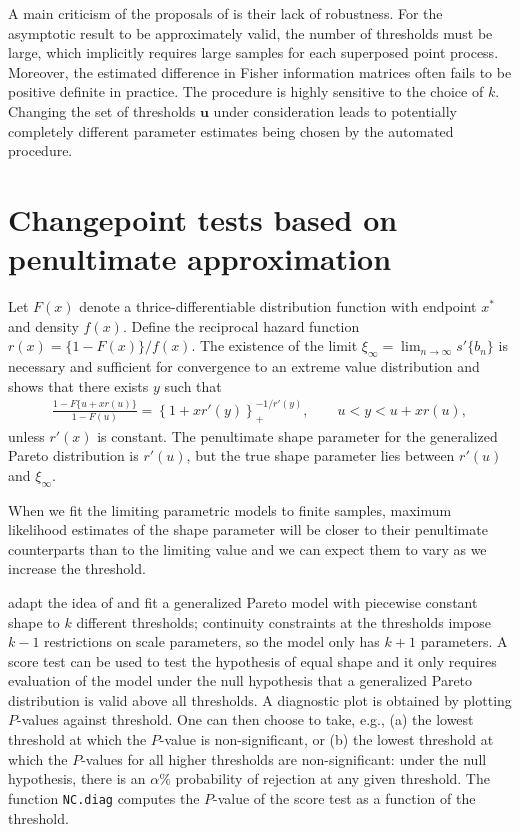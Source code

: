 \documentclass[]{book}
\begin{document}
A main criticism of the proposals of \citet{Wadsworth:2016} is their lack of robustness. For the asymptotic result to be approximately valid, the number of thresholds must be large, which implicitly requires large samples for each superposed point process. Moreover, the estimated difference in Fisher information matrices often fails to be positive definite in practice. The procedure is highly sensitive to the choice of \(k\). Changing the set of thresholds \(\boldsymbol{u}\) under consideration leads to potentially completely different parameter estimates being chosen by the automated procedure.

\hypertarget{changepoint-tests-based-on-penultimate-approximation}{%
\section{Changepoint tests based on penultimate approximation}\label{changepoint-tests-based-on-penultimate-approximation}}

Let \(F(x)\) denote a thrice-differentiable distribution function with endpoint \(x^*\) and density \(f(x)\). Define the reciprocal hazard function \(r(x) = \{1-F(x)\}/f(x)\).
The existence of the limit \(\xi_{\infty} = \lim_{n \to \infty} s'\{b_n\}\) is necessary and sufficient for convergence to an extreme value distribution and \citet{Smith:1987} shows that there exists \(y\) such that
\begin{align*}
 \frac{1-F\{u+xr(u)\}}{1-F(u)} = \left\{1+xr'(y)\right\}_{+}^{-1/r'(y)}, \qquad u < y < u+xr(u),
\end{align*}
unless \(r'(x)\) is constant. The penultimate shape parameter for the generalized Pareto distribution is \(r'(u)\), but the true shape parameter lies between \(r'(u)\) and \(\xi_{\infty}\).

When we fit the limiting parametric models to finite samples, maximum likelihood estimates of the shape parameter will be closer to their penultimate counterparts than to the limiting value and we can expect them to vary as we increase the threshold.

\citet{Northrop:2014} adapt the idea of \citet{Wadsworth:2012} and fit a generalized Pareto model with piecewise constant shape to \(k\) different thresholds; continuity constraints at the thresholds impose \(k-1\) restrictions on scale parameters, so the model only has \(k+1\) parameters. A score test can be used to test the hypothesis of equal shape and it only requires evaluation of the model under the null hypothesis that a generalized Pareto distribution is valid above all thresholds. A diagnostic plot is obtained by plotting \(P\)-values against threshold. One can then choose to take, e.g., (a) the lowest threshold at which the \(P\)-value is non-significant, or (b) the lowest threshold at which the \(P\)-values for all higher thresholds are non-significant: under the null hypothesis, there is an \(\alpha\%\) probability of rejection at any given threshold. The function \texttt{NC.diag} computes the \(P\)-value of the score test as a function of the threshold.
\end{document}

